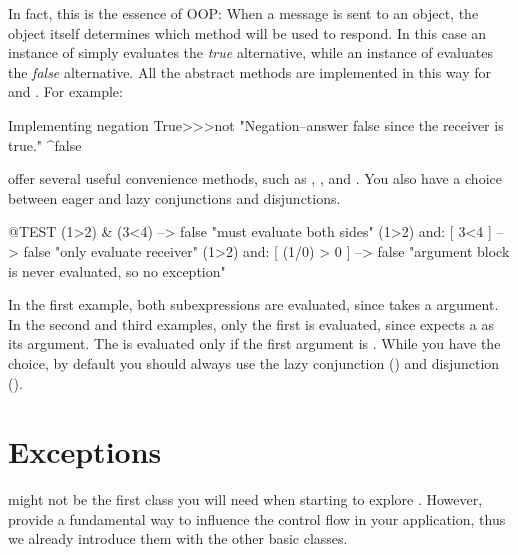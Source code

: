 \documentclass[a4paper,10pt,twoside]{book}
\begin{document}
In fact, this is the essence of OOP:
When a message is sent to an object, the object itself determines which method will be used to respond.
In this case an instance of  simply evaluates the \emph{true} alternative, while an instance of  evaluates the \emph{false} alternative.
All the abstract  methods are implemented in this way for  and .
For example:

\begin{method}{Implementing negation}
True>>>not
    "Negation--answer false since the receiver is true."
    ^false
\end{method}

 offer several useful convenience methods, such as , , and .
You also have a choice between eager and lazy conjunctions and disjunctions.

\begin{code}{@TEST}
(1>2) & (3<4)              --> false    "must evaluate both sides"
(1>2) and: [ 3<4 ]        --> false    "only evaluate receiver"
(1>2) and: [ (1/0) > 0 ] --> false    "argument block is never evaluated, so no exception"
\end{code}

In the first example, both  subexpressions are evaluated, since  takes a  argument.
In the second and third examples, only the first is evaluated, since  expects a  as its argument.
The  is evaluated only if the first argument is .
While you have the choice, by default you should always use the lazy conjunction () and disjunction ().


\section{Exceptions}

 might not be the first class you will need when starting to explore \sq. 
However,  provide a fundamental way to influence the control flow in your application, thus we already introduce them with the other basic classes.
\end{document}
